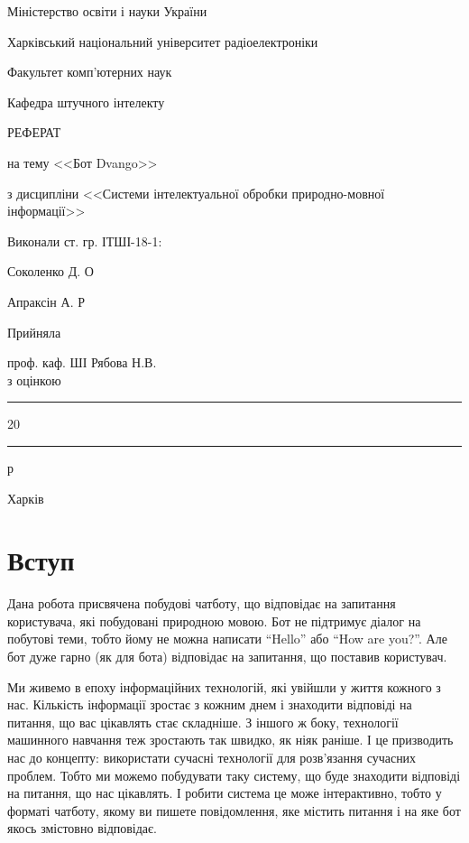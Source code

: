 \documentclass[a4paper,14pt]{extreport}
\newcommand\chap[1]{%
  \chapter*{#1}%
  \addcontentsline{toc}{chapter}{\uppercase{#1}}}
\begin{document}
\begin{titlepage}
	\centering
    Міністерство освіти і науки України
    
    Харківський національний університет радіоелектроніки
    \vspace{1cm}

    Факультет комп'ютерних наук
    \vspace{1cm}

    Кафедра штучного інтелекту

    \vspace{2cm}
    \uppercase{Реферат}
    \vspace{1cm}

    на тему <<Бот Dvango>>
    \vspace{1cm}

    з дисципліни <<Системи інтелектуальної обробки природно-мовної інформації>>

    \begin{flushleft}
    \vspace{4cm}
    Виконали ст. гр. ІТШІ-18-1:
    \begin{minipage}[t]{10cm}
        Соколенко Д. О

        Апраксін А. Р
    \end{minipage}

    \vspace{1cm}

    Прийняла
    \begin{minipage}[t]{10cm}
        проф. каф. ШІ Рябова Н.В.\\
        з оцінкою \say{\rule{2cm}{0.15mm}}\\
        \say{\rule{0.7cm}{0.15mm}}\rule{2cm}{0.15mm}20\rule{0.7cm}{0.15mm}р
    \end{minipage}
    \end{flushleft}
	\vfill

	{Харків \the\year{}}
\end{titlepage}
\restoregeometry

\tableofcontents
\newpage

\setcounter{page}{3}
\chap{Вступ}
    Дана робота присвячена побудові чатботу, що відповідає на запитання користувача, які побудовані природною мовою. Бот не підтримує діалог на побутові теми, тобто йому не можна написати ``Hello'' або ``How are you?''. Але бот дуже гарно (як для бота) відповідає на запитання, що поставив користувач.

    Ми живемо в епоху інформаційних технологій, які увійшли у життя кожного з нас. Кількість інформації зростає з кожним днем і знаходити відповіді на питання, що вас цікавлять стає складніше. З іншого ж боку, технології машинного навчання теж зростають так швидко, як ніяк раніше. І це призводить нас до концепту: використати сучасні технології для розв'язання сучасних проблем. Тобто ми можемо побудувати таку систему, що буде знаходити відповіді на питання, що нас цікавлять. І робити система це може інтерактивно, тобто у форматі чатботу, якому ви пишете повідомлення, яке містить питання і на яке бот якось змістовно відповідає.
\end{document}
